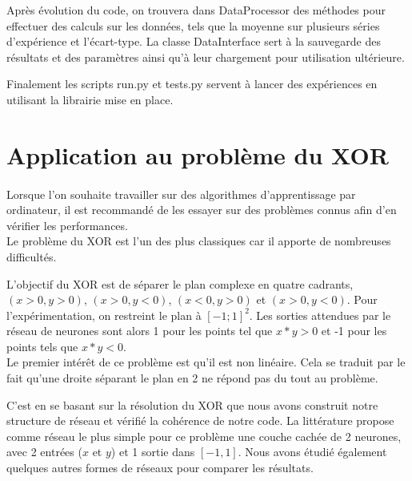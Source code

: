 Après évolution du code, on trouvera dans DataProcessor des méthodes pour effectuer des calculs sur les données, tels que la moyenne sur plusieurs séries d'expérience et l'écart-type. La classe DataInterface sert à la sauvegarde des résultats et des paramètres ainsi qu'à leur chargement pour utilisation ultérieure. 

Finalement les scripts run.py et tests.py servent à lancer des expériences en utilisant la librairie mise en place.




\section{Application au problème du XOR}

\paragraph*{}
Lorsque l'on souhaite travailler sur des algorithmes d'apprentissage par ordinateur, il est recommandé de les essayer sur des problèmes connus afin d'en vérifier les performances. \\
Le problème du XOR est l'un des plus classiques car il apporte de nombreuses difficultés.

L'objectif du XOR est de séparer le plan complexe en quatre cadrants, $(x >0, y > 0)$, $ (x>0, y<0)$, $ (x<0, y>0)$ et $ (x>0, y<0) $. Pour l'expérimentation, on restreint le plan à $[-1;1]^2$. Les sorties attendues par le réseau de neurones sont alors 1 pour les points tel que $x*y > 0 $ et -1 pour les points tels que $x*y<0$. \\
Le premier intérêt de ce problème est qu'il est non linéaire. Cela se traduit par le fait qu'une droite séparant le plan en 2 ne répond pas du tout au problème.

C'est en se basant sur la résolution du XOR que nous avons construit notre structure de réseau et vérifié la cohérence de notre code. La littérature propose comme réseau le plus simple pour ce problème une couche cachée de 2 neurones, avec 2 entrées ($x$ et $y$) et 1 sortie dans $[-1, 1]$. Nous avons étudié également quelques autres formes de réseaux pour comparer les résultats.

